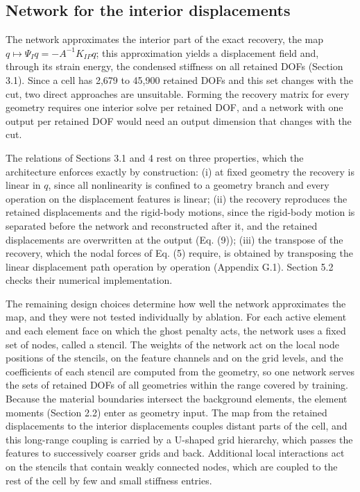 \documentclass[preprint,12pt,authoryear]{elsarticle}
\begin{document}
\subsection{Network for the interior displacements}

The network approximates the interior part of the exact recovery, the map \(q\mapsto \Psi_Iq=-A^{-1}K_{IP}q\); this approximation yields a displacement field and, through its strain energy, the condensed stiffness on all retained DOFs (Section 3.1). Since a cell has 2,679 to 45,900 retained DOFs and this set changes with the cut, two direct approaches are unsuitable. Forming the recovery matrix for every geometry requires one interior solve per retained DOF, and a network with one output per retained DOF would need an output dimension that changes with the cut.

The relations of Sections 3.1 and 4 rest on three properties, which the architecture enforces exactly by construction: (i) at fixed geometry the recovery is linear in \(q\), since all nonlinearity is confined to a geometry branch and every operation on the displacement features is linear; (ii) the recovery reproduces the retained displacements and the rigid-body motions, since the rigid-body motion is separated before the network and reconstructed after it, and the retained displacements are overwritten at the output (Eq. (9)); (iii) the transpose of the recovery, which the nodal forces of Eq. (5) require, is obtained by transposing the linear displacement path operation by operation (Appendix G.1). Section 5.2 checks their numerical implementation.

The remaining design choices determine how well the network approximates the map, and they were not tested individually by ablation. For each active element and each element face on which the ghost penalty acts, the network uses a fixed set of nodes, called a stencil. The weights of the network act on the local node positions of the stencils, on the feature channels and on the grid levels, and the coefficients of each stencil are computed from the geometry, so one network serves the sets of retained DOFs of all geometries within the range covered by training. Because the material boundaries intersect the background elements, the element moments (Section 2.2) enter as geometry input. The map from the retained displacements to the interior displacements couples distant parts of the cell, and this long-range coupling is carried by a U-shaped grid hierarchy, which passes the features to successively coarser grids and back. Additional local interactions act on the stencils that contain weakly connected nodes, which are coupled to the rest of the cell by few and small stiffness entries.
\end{document}
